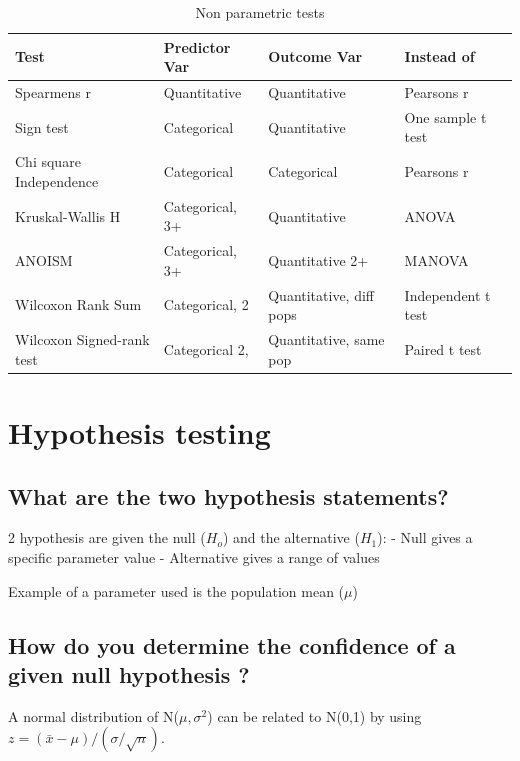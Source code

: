 \documentclass[11pt]{scrartcl} %
\begin{document}
\begin{table}[h] %
	\centering %
	\begin{tabular}{P{2.5cm} P{2.5cm} P{2.5cm} P{2.5cm}}		
		\toprule
		\textbf{Test} & \textbf{Predictor Var} & \textbf{Outcome Var} & \textbf{Instead of} \\
		\midrule
		Spearmens r & Quantitative & Quantitative & Pearsons r \\
		Sign test & Categorical & Quantitative & One sample t test \\
		Chi square Independence & Categorical & Categorical & Pearsons r\\
		Kruskal-Wallis H & Categorical, 3+ & Quantitative & ANOVA\\
		ANOISM & Categorical, 3+ & Quantitative 2+ & MANOVA \\
		Wilcoxon Rank Sum & Categorical, 2 & Quantitative, diff pops & Independent t test\\
		Wilcoxon Signed-rank test & Categorical 2, & Quantitative, same pop & Paired t test\\
		\bottomrule
	\end{tabular}
	\caption{Non parametric tests}
	\label{table:nonparametric}
\end{table}

\section{Hypothesis testing}

\subsection{What are the two hypothesis
statements?}

2 hypothesis are given the null (\(H_o\)) and the alternative (\(H_1\)):
- Null gives a specific parameter value - Alternative gives a range of
values

Example of a parameter used is the population mean (\(\mu\))

\subsection{How do you determine the confidence of a given null
hypothesis
?}

A normal distribution of N(\(\mu, \sigma^2\)) can be related to N(0,1)
by using \(z = (\bar{x} - \mu)/ (\sigma/\sqrt{n})\).\\
\end{document}
